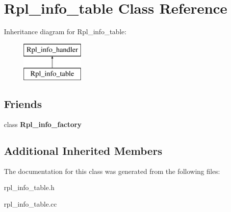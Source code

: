 \hypertarget{classRpl__info__table}{}\section{Rpl\+\_\+info\+\_\+table Class Reference}
\label{classRpl__info__table}
Inheritance diagram for Rpl\+\_\+info\+\_\+table\+:\begin{figure}[H]
\begin{center}
\leavevmode
\includegraphics[height=2.000000cm]{classRpl__info__table}
\end{center}
\end{figure}
\subsection*{Friends}
\begin{DoxyCompactItemize}
\item 
\mbox{\label{classRpl__info__table_a78a99f8bbca705e7958bb3ffaac85abd}} 
class {\bfseries Rpl\+\_\+info\+\_\+factory}
\end{DoxyCompactItemize}
\subsection*{Additional Inherited Members}


The documentation for this class was generated from the following files\+:\begin{DoxyCompactItemize}
\item 
rpl\+\_\+info\+\_\+table.\+h\item 
rpl\+\_\+info\+\_\+table.\+cc\end{DoxyCompactItemize}
